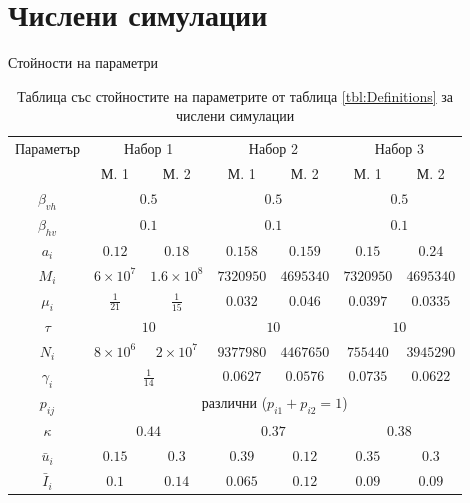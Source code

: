 \section{\hspace{1em} Числени симулации}
\begin{frame}[t]{Стойности на параметри}
  \begin{table}
    \begin{small}
      \begin{tabular}{ |c ||c c c c c c|  }
        \hline
        \multirow{2}{*}{Параметър}& \multicolumn{2}{c}{Набор 1}& \multicolumn{2}{c}{Набор 2} & \multicolumn{2}{c|}{Набор 3}\\
        & М. 1 & М. 2 & М. 1 & М. 2 & М. 1 & М. 2\\
        \hline
        $\beta_{vh}$ & \multicolumn{2}{c}{$0.5$} & \multicolumn{2}{c}{$0.5$}  & \multicolumn{2}{c|}{$0.5$}\\
        $\beta_{hv}$ & \multicolumn{2}{c}{$0.1$} & \multicolumn{2}{c}{$0.1$} & \multicolumn{2}{c|}{$0.1$}\\
        $a_i$ & $0.12$ & $0.18$ & $0.158$ & $0.159$ & $0.15$ & $0.24$\\
        $M_i$ & $6 \times 10^7$ & $1.6 \times 10^8$ & $7320950$ & $4695340$ & $7320950$ & $4695340$\\
        $\mu_i$ & $\frac{1}{21}$ & $\frac{1}{15}$ & $0.032$ & $0.046$ & $0.0397$ & $0.0335$\\
        $\tau$ & \multicolumn{2}{c}{$10$} & \multicolumn{2}{c}{$10$} & \multicolumn{2}{c|}{$10$}\\
        $N_i$ & $8 \times 10^6$ & $2 \times 10^7$ & $9377980$ & $4467650$ & $755440$ & $3945290$\\
        $\gamma_i$ & \multicolumn{2}{c}{$\frac{1}{14}$} & $0.0627$ & $0.0576$ & $0.0735$ & $0.0622$\\
        $p_{ij}$ & \multicolumn{6}{c|}{различни ($p_{i1}+p_{i2}=1$)}\\
        $\kappa$ & \multicolumn{2}{c}{$0.44$} & \multicolumn{2}{c}{$0.37$} & \multicolumn{2}{c|}{$0.38$}\\
        $\bar{u}_i$ & $0.15$ & $0.3$ & $0.39$ & $0.12$ & $0.35$ & $0.3$\\
        $\bar{I}_i$ & $0.1$ & $0.14$ & $0.065$ & $0.12$ & $0.09$ & $0.09$\\
        \hline
      \end{tabular}
    \end{small}
    \caption{Таблица със стойностите на параметрите от таблица \ref{tbl:Definitions} за числени симулации}
    \label{tbl:ParameterValues}
  \end{table}
\end{frame}

